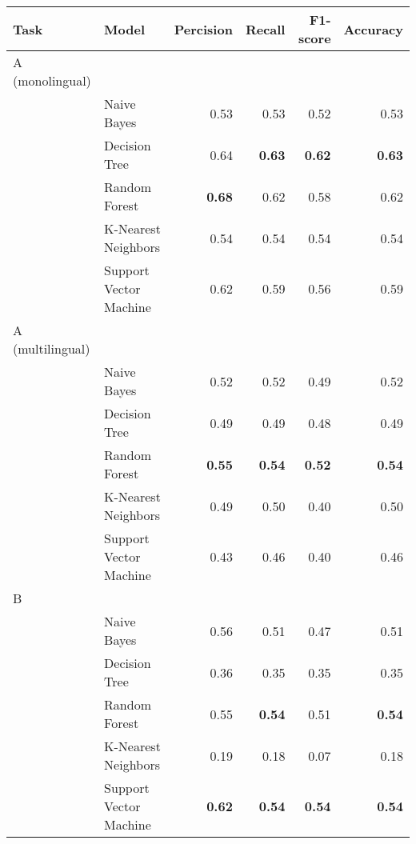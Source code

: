 \documentclass[11pt]{article}
\begin{document}
\begin{table*}[]
	\begin{tabular}{llrrrr}
		\toprule
		Task             & Model                  & Percision     & Recall        & F1-score      & Accuracy      \\
		\midrule
		A (monolingual)  &                        &               &               &               &               \\
		                 & Naive Bayes            & 0.53          & 0.53          & 0.52          & 0.53          \\
		                 & Decision Tree          & 0.64          & \textbf{0.63} & \textbf{0.62} & \textbf{0.63} \\
		                 & Random Forest          & \textbf{0.68} & 0.62          & 0.58          & 0.62          \\
		                 & K-Nearest Neighbors    & 0.54          & 0.54          & 0.54          & 0.54          \\
		                 & Support Vector Machine & 0.62          & 0.59          & 0.56          & 0.59          \\
		\midrule
		A (multilingual) &                        &               &               &               &               \\
		                 & Naive Bayes            & 0.52          & 0.52          & 0.49          & 0.52          \\
		                 & Decision Tree          & 0.49          & 0.49          & 0.48          & 0.49          \\
		                 & Random Forest          & \textbf{0.55} & \textbf{0.54} & \textbf{0.52} & \textbf{0.54} \\
		                 & K-Nearest Neighbors    & 0.49          & 0.50          & 0.40          & 0.50          \\
		                 & Support Vector Machine & 0.43          & 0.46          & 0.40          & 0.46          \\
		\midrule
		B                &                        &               &               &               &               \\
		                 & Naive Bayes            & 0.56          & 0.51          & 0.47          & 0.51          \\
		                 & Decision Tree          & 0.36          & 0.35          & 0.35          & 0.35          \\
		                 & Random Forest          & 0.55          & \textbf{0.54} & 0.51          & \textbf{0.54} \\
		                 & K-Nearest Neighbors    & 0.19          & 0.18          & 0.07          & 0.18          \\
		                 & Support Vector Machine & \textbf{0.62} & \textbf{0.54} & \textbf{0.54} & \textbf{0.54} \\
		\bottomrule
	\end{tabular}
\end{table*}
\end{document}

